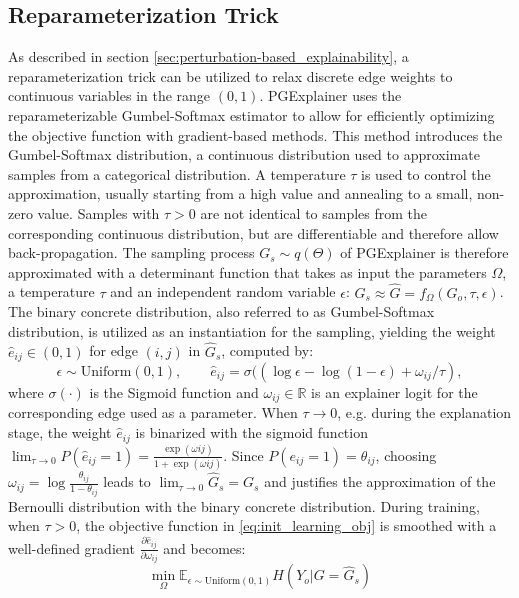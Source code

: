 \subsection{Reparameterization Trick}
As described in section \ref{sec:perturbation-based_explainability}, a reparameterization trick can be utilized to relax discrete edge weights to continuous variables in the range $(0,1)$. PGExplainer uses the reparameterizable Gumbel-Softmax estimator\cite{jang2016categorical} to allow for efficiently optimizing the objective function with gradient-based methods. This method introduces the Gumbel-Softmax distribution, a continuous distribution used to approximate samples from a categorical distribution. A temperature $\tau$ is used to control the approximation, usually starting from a high value and annealing to a small, non-zero value. Samples with $\tau > 0$ are not identical to samples from the corresponding continuous distribution, but are differentiable and therefore allow back-propagation. The sampling process $G_s \sim q(\Theta)$ of PGExplainer is therefore approximated with a determinant function that takes as input the parameters $\Omega$, a temperature $\tau$ and an independent random variable $\epsilon$: $G_s \approx \hat{G}=f_\Omega(G_o,\tau,\epsilon)$. The binary concrete distribution\cite{maddison2016concrete}, also referred to as Gumbel-Softmax distribution, is utilized as an instantiation for the sampling, yielding the weight $\hat{e}_{ij} \in (0,1)$ for edge $(i,j)$ in $\hat{G}_s$, computed by:
\begin{equation}
    \label{eq:reparam_trick}
    \epsilon \sim \text{Uniform}(0,1), \qquad \hat{e}_{ij}=\sigma((\log \epsilon - \log(1-\epsilon)+\omega_{ij}/\tau),
\end{equation}
where $\sigma(\cdot)$ is the Sigmoid function and $\omega_{ij} \in \mathbb{R}$ is an explainer logit for the corresponding edge used as a parameter. When $\tau \rightarrow 0$, e.g. during the explanation stage, the weight $\hat{e}_{ij}$ is binarized with the sigmoid function $\lim_{\tau\rightarrow 0}P(\hat{e}_{ij} = 1) = \frac{\exp (\omega{ij})}{1+\exp (\omega{ij})}$. Since $P(e_{ij} = 1) = \theta_{ij}$, choosing $\omega_{ij} = \log\frac{\theta_{ij}}{1-\theta_{ij}}$ leads to $\lim_{\tau\rightarrow 0}\hat{G}_s = G_s$ and justifies the approximation of the Bernoulli distribution with the binary concrete distribution. During training, when $\tau > 0$, the objective function in \eqref{eq:init_learning_obj} is smoothed with a well-defined gradient $\frac{\partial\hat{e}_{ij}}{\partial\omega_{ij}}$ and becomes:
\begin{equation}
    \min_\Omega \mathbb{E}_{\epsilon \sim \text{Uniform}(0,1)}H(Y_o| G = \hat{G}_s)
\end{equation}

